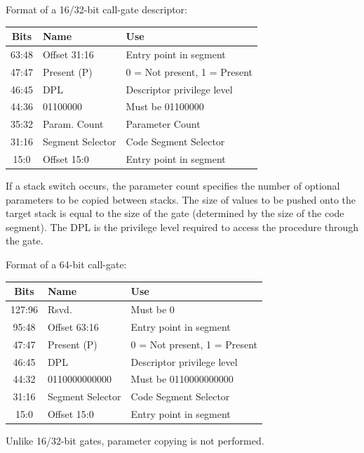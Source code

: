 \documentclass{article}
\newcommand{\layout}[1]{\parbox{\linewidth}{#1}}
\begin{document}
\layout{
  Format of a 16/32-bit call-gate descriptor:
  \begin{table}[H]
    \centering
    \begin{tabular}{|c|l|l|}
      \hline \textbf{Bits} & \textbf{Name} & \textbf{Use} \\ \hline
      63:48 & Offset 31:16 & Entry point in segment \\
      47:47 & Present (P) & 0 = Not present, 1 = Present \\
      46:45 & DPL & Descriptor privilege level \\
      44:36 & 01100000 & Must be 01100000 \\
      35:32 & Param. Count & Parameter Count \\
      31:16 & Segment Selector & Code Segment Selector \\
      15:0 & Offset 15:0 & Entry point in segment \\ \hline
    \end{tabular}
  \end{table}

  If a stack switch occurs, the parameter count specifies the number of optional parameters to be copied between stacks.
  The size of values to be pushed onto the target stack is equal to the size of the gate (determined by the size of the code segment).
  The DPL is the privilege level required to access the procedure through the gate.

  \bigskip \cite[Chapter~6.8.3]{sdm3}
} \layout

\layout{
  Format of a 64-bit call-gate:
  \begin{table}[H]
    \centering
    \begin{tabular}{|c|l|l|}
      \hline \textbf{Bits} & \textbf{Name} & \textbf{Use} \\ \hline
      127:96 & Rsvd. & Must be 0 \\
      95:48 & Offset 63:16 & Entry point in segment \\
      47:47 & Present (P) & 0 = Not present, 1 = Present \\
      46:45 & DPL & Descriptor privilege level \\
      44:32 & 0110000000000 & Must be 0110000000000 \\
      31:16 & Segment Selector & Code Segment Selector \\
      15:0 & Offset 15:0 & Entry point in segment \\ \hline
    \end{tabular}
  \end{table}

  Unlike 16/32-bit gates, parameter copying is not performed.

  \bigskip \cite[Chapter~6.8.3.1]{sdm3}
}
\end{document}
